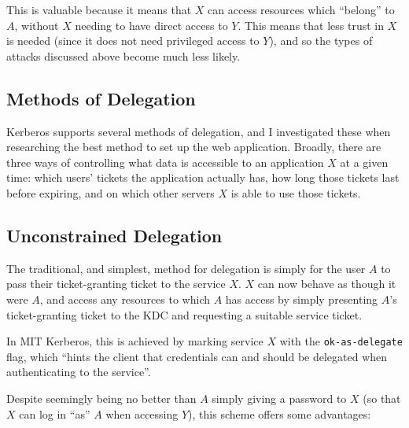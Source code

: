\documentclass[12pt]{report}
\begin{document}
This is valuable because it means that $X$ can access resources which ``belong'' to $A$, without $X$ needing to have direct access to $Y$. This means that less trust in $X$ is needed (since it does not need privileged access to $Y$), and so the types of attacks discussed above become much less likely.

\subsection{Methods of Delegation}
Kerberos supports several methods of delegation, and I investigated these when researching the best method to set up the web application. Broadly, there are three ways of controlling what data is accessible to an application $X$ at a given time: which users' tickets the application actually has, how long those tickets last before expiring, and on which other servers $X$ is able to use those tickets.

\subsection{Unconstrained Delegation}
The traditional, and simplest, method for delegation is simply for the user $A$ to pass their ticket-granting ticket to the service $X$. $X$ can now behave as though it were $A$, and access any resources to which $A$ has access by simply presenting $A$'s ticket-granting ticket to the KDC and requesting a suitable service ticket\cite{JohnKol-unconstrained-deleg}.

In MIT Kerberos, this is achieved by marking service $X$ with the \verb+ok-as-delegate+ flag, which ``hints the client that credentials can and should be delegated when authenticating to the service''\cite{KDC-conf-docs}.

Despite seemingly being no better than $A$ simply giving a password to $X$ (so that $X$ can log in ``as'' $A$ when accessing $Y$), this scheme offers some advantages:
\end{document}
